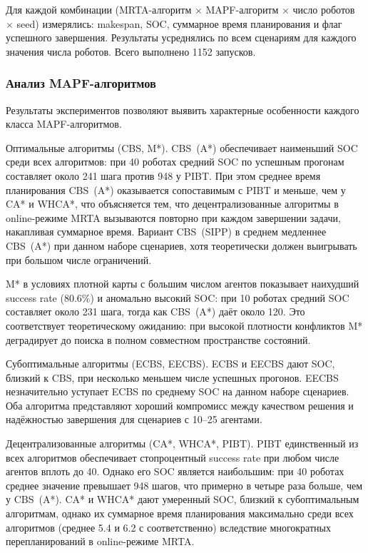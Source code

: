 Для каждой комбинации (MRTA-алгоритм $\times$ MAPF-алгоритм $\times$ число роботов $\times$ seed) измерялись: makespan, SOC, суммарное время планирования и флаг успешного завершения. Результаты усреднялись по всем сценариям для каждого значения числа роботов. Всего выполнено 1152 запусков.

\subsubsection{Анализ MAPF-алгоритмов}

Результаты экспериментов позволяют выявить характерные особенности каждого класса MAPF-алгоритмов.

Оптимальные алгоритмы (CBS, M*). CBS~(A*) обеспечивает наименьший SOC среди всех алгоритмов: при 40 роботах средний SOC по успешным прогонам составляет около 241 шага против 948 у PIBT. При этом среднее время планирования CBS~(A*) оказывается сопоставимым с PIBT и меньше, чем у CA* и WHCA*, что объясняется тем, что децентрализованные алгоритмы в online-режиме MRTA вызываются повторно при каждом завершении задачи, накапливая суммарное время. Вариант CBS~(SIPP) в среднем медленнее CBS~(A*) при данном наборе сценариев, хотя теоретически должен выигрывать при большом числе ограничений.

M* в условиях плотной карты с большим числом агентов показывает наихудший success rate (80.6\%) и аномально высокий SOC: при 10 роботах средний SOC составляет около 231 шага, тогда как CBS~(A*) даёт около 120. Это соответствует теоретическому ожиданию: при высокой плотности конфликтов M* деградирует до поиска в полном совместном пространстве состояний.

Субоптимальные алгоритмы (ECBS, EECBS). ECBS и EECBS дают SOC, близкий к CBS, при несколько меньшем числе успешных прогонов. EECBS незначительно уступает ECBS по среднему SOC на данном наборе сценариев. Оба алгоритма представляют хороший компромисс между качеством решения и надёжностью завершения для сценариев с 10--25 агентами.

Децентрализованные алгоритмы (CA*, WHCA*, PIBT). PIBT единственный из всех алгоритмов обеспечивает стопроцентный success rate при любом числе агентов вплоть до 40. Однако его SOC является наибольшим: при 40 роботах среднее значение превышает 948 шагов, что примерно в четыре раза больше, чем у CBS~(A*). CA* и WHCA* дают умеренный SOC, близкий к субоптимальным алгоритмам, однако их суммарное время планирования максимально среди всех алгоритмов (среднее 5.4 и 6.2 с соответственно) вследствие многократных перепланирований в online-режиме MRTA.

